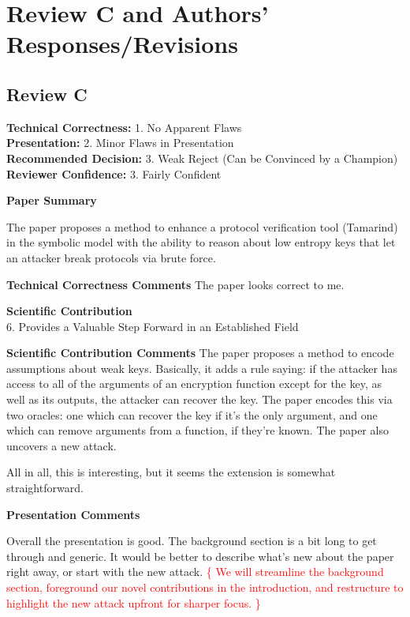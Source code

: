 \documentclass{article}
\newcommand{\response}[1]{\textcolor{red}{\{#1\}}}
\begin{document}
\section{Review C and Authors' Responses/Revisions}
\subsection{Review C}

\noindent\textbf{Technical Correctness:} 1. No Apparent Flaws\\
\textbf{Presentation:} 2. Minor Flaws in Presentation\\
\textbf{Recommended Decision:} 3. Weak Reject (Can be Convinced by a Champion)\\
\textbf{Reviewer Confidence:} 3. Fairly Confident

\rule{0pt}{8pt}

\noindent\textbf{Paper Summary}

The paper proposes a method to enhance a protocol verification tool (Tamarind) in the symbolic model with the ability to reason about low entropy keys that let an attacker break protocols via brute force.

\rule{0pt}{8pt}

\noindent\textbf{Technical Correctness Comments}
The paper looks correct to me.

\rule{0pt}{8pt}

\noindent\textbf{Scientific Contribution}\\
6. Provides a Valuable Step Forward in an Established Field

\rule{0pt}{8pt}

\noindent\textbf{Scientific Contribution Comments}
The paper proposes a method to encode assumptions about weak keys. 
Basically, it adds a rule saying: if the attacker has access to all of the arguments of an encryption function except for the key, as well as its outputs, the attacker can recover the key. 
The paper encodes this via two oracles: one which can recover the key if it's the only argument, and one which can remove arguments from a function, if they're known. 
The paper also uncovers a new attack.

All in all, this is interesting, but it seems the extension is somewhat straightforward.

\rule{0pt}{8pt}

\noindent\textbf{Presentation Comments}

Overall the presentation is good. 
The background section is a bit long to get through and generic. 
It would be better to describe what's new about the paper right away, or start with the new attack.
\response{
    We will streamline the background section, foreground our novel contributions in the introduction, and restructure to highlight the new attack upfront for sharper focus.
}
\end{document}

